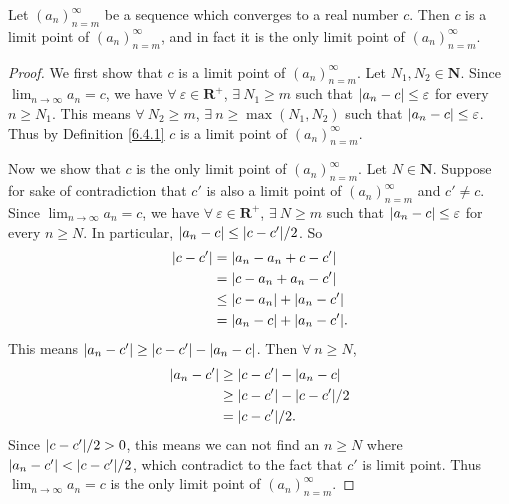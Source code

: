 \setcounter{theorem}{4}
\begin{proposition}\label{6.4.5}
    Let \((a_n)_{n = m}^\infty\) be a sequence which converges to a real number \(c\).
    Then \(c\) is a limit point of \((a_n)_{n = m}^\infty\), and in fact it is the only limit point of \((a_n)_{n = m}^\infty\).
\end{proposition}

\begin{proof}
    We first show that \(c\) is a limit point of \((a_n)_{n = m}^\infty\).
    Let \(N_1, N_2 \in \mathbf{N}\).
    Since \(\lim_{n \to \infty} a_n = c\), we have \(\forall\ \varepsilon \in \mathbf{R}^+\), \(\exists\ N_1 \geq m\) such that \(\abs*{a_n - c} \leq \varepsilon\) for every \(n \geq N_1\).
    This means \(\forall\ N_2 \geq m\), \(\exists\ n \geq \max(N_1, N_2)\) such that \(\abs*{a_n - c} \leq \varepsilon\).
    Thus by Definition \ref{6.4.1} \(c\) is a limit point of \((a_n)_{n = m}^\infty\).

    Now we show that \(c\) is the only limit point of \((a_n)_{n = m}^\infty\).
    Let \(N \in \mathbf{N}\).
    Suppose for sake of contradiction that \(c'\) is also a limit point of \((a_n)_{n = m}^\infty\) and \(c' \neq c\).
    Since \(\lim_{n \to \infty} a_n = c\), we have \(\forall\ \varepsilon \in \mathbf{R}^+\), \(\exists\ N \geq m\) such that \(\abs*{a_n - c} \leq \varepsilon\) for every \(n \geq N\).
    In particular, \(\abs*{a_n - c} \leq \abs*{c - c'} / 2\).
    So
    \begin{align*}
        \abs*{c - c'} & = \abs*{a_n - a_n + c - c'}           \\
                      & = \abs*{c - a_n + a_n - c'}           \\
                      & \leq \abs*{c - a_n} + \abs*{a_n - c'} \\
                      & = \abs*{a_n - c} + \abs*{a_n - c'}.
    \end{align*}
    This means \(\abs*{a_n - c'} \geq \abs*{c - c'} - \abs*{a_n - c}\).
    Then \(\forall\ n \geq N\),
    \begin{align*}
        \abs*{a_n - c'} & \geq \abs*{c - c'} - \abs*{a_n - c}    \\
                        & \geq \abs*{c - c'} - \abs*{c - c'} / 2 \\
                        & = \abs*{c - c'} / 2.
    \end{align*}
    Since \(\abs*{c - c'} / 2 > 0\), this means we can not find an \(n \geq N\) where \(\abs*{a_n - c'} < \abs*{c - c'} / 2\), which contradict to the fact that \(c'\) is limit point.
    Thus \(\lim_{n \to \infty} a_n = c\) is the only limit point of \((a_n)_{n = m}^\infty\).
\end{proof}

